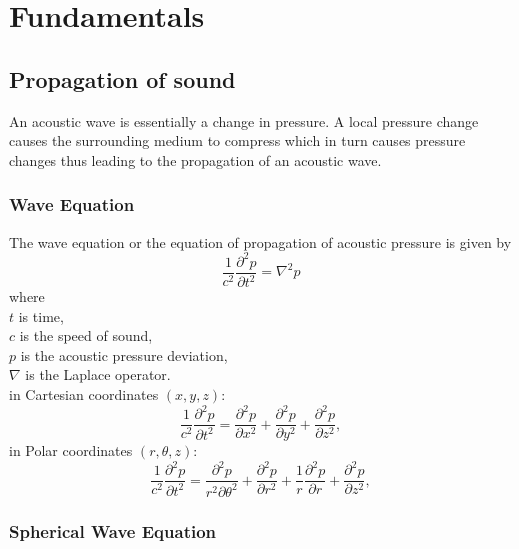 \chapter{Fundamentals}
\label{chap:fundamentals}

\section{Propagation of sound}
An acoustic wave is essentially a change in pressure. A local pressure change causes the surrounding medium to compress which in turn causes pressure changes thus leading to the propagation of an acoustic wave.

\subsection{Wave Equation}
The wave equation or the equation of propagation of acoustic pressure is given by
\begin{equation}
    \frac{1}{c^2}\frac{\partial^2p}{\partial t^2} = \nabla^2p
\end{equation}
where\\

$t$ is time,\\

$c$ is the speed of sound,\\
$p$ is the acoustic pressure deviation,\\
$\nabla$ is the Laplace operator.\\
in Cartesian coordinates $(x,y,z)$:
\begin{equation}
    \frac{1}{c^2}\frac{\partial^2p}{\partial t^2} = \frac{\partial^2p}{\partial x^2} + \frac{\partial^2p}{\partial y^2} + \frac{\partial^2p}{\partial z^2},
\end{equation}
in Polar coordinates $(r,\theta, z)$:
\begin{equation}
    \frac{1}{c^2}\frac{\partial^2p}{\partial t^2} = \frac{\partial^2p}{r^2\partial \theta^2} + \frac{\partial^2p}{\partial r^2} + \frac{1}{r}\frac{\partial^2p}{\partial r} + \frac{\partial^2p}{\partial z^2},
\end{equation}

\subsection{Spherical Wave Equation}

